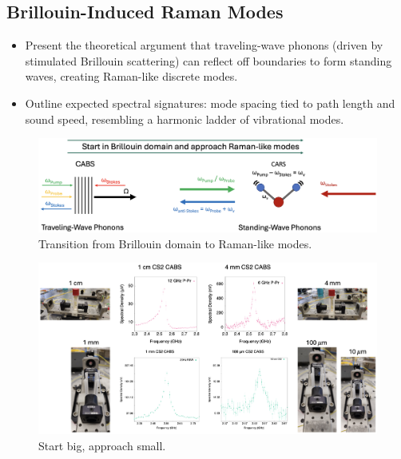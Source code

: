 \subsection{Brillouin-Induced Raman Modes}
\label{subsec:Raman:Brillouin-InducedRamanModes}

\begin{itemize}
  \item Present the theoretical argument that traveling-wave phonons (driven by stimulated Brillouin scattering) can reflect off boundaries to form standing waves, creating Raman-like discrete modes.
  \item Outline expected spectral signatures: mode spacing tied to path length and sound speed, resembling a harmonic ladder of vibrational modes.
\end{itemize}

\begin{figure}[t]
  \centering
  \includegraphics[width=\textwidth]{figs/4-Raman/ExploreBrillouinRamanTransition.png}
  \caption{Transition from Brillouin domain to Raman-like modes.}
  \label{fig:Raman:BrillouinRamanTransition}
\end{figure}

\begin{figure}[t]
  \centering
  \includegraphics[width=\textwidth]{figs/4-Raman/StartBigApproachSmall.png}
  \caption{Start big, approach small.}
  \label{fig:StartBigApproachSmall}
\end{figure}

